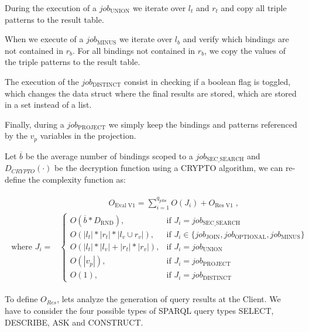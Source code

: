 During the execution of a $job_{\text{UNION}}$ we iterate over $l_t$ and $r_t$ and copy all triple patterns to the result table.

When we execute of a $job_{\text{MINUS}}$ we iterate over $l_b$ and verify which bindings are not contained in $r_b$. For all bindings not contained in $r_b$, we copy the values of the triple patterns to the result table.

The execution of the $job_{\text{DISTINCT}}$ consist in checking if a boolean flag is toggled, which changes the data struct where the final results are stored, which are stored in a set instead of a list.

Finally, during a $job_{\text{PROJECT}}$ we simply keep the bindings and patterns referenced by the $v_p$ variables in the projection.

Let $\overline{b}$ be the average number of bindings scoped to a $job_{\text{SEC\_SEARCH}}$ and $D_{CRYPTO}(\cdot)$ be the decryption function using a CRYPTO algorithm, we can re-define the complexity function as:

\begin{align}
    \label{equation:query-evaluation-v1-jobs}
    \begin{split}
        & \quad \quad \quad \quad \quad \quad O_{\text{Eval V1}} = \sum_{i=1}^{q_{\text{jobs}}} O\left(J_i\right) + O_{\text{Res V1}}\;,\\
        \text{where } J_i =&
                    \begin{cases}
                        O\left( \overline{b} * D_{\text{RND}} \right), & \text{if } J_i = job_{\text{SEC\_SEARCH}} \\
                        O\left(|l_t| * |r_t| * |l_v \cup r_v|\right), & \text{if } J_i \in \{job_{\text{JOIN}}, job_{\text{OPTIONAL}}, job_{\text{MINUS}}\} \\
                        O\left(|l_t| * |l_v| + |r_t| * |r_v|\right), & \text{if } J_i = job_{\text{UNION}} \\
                        O\left(|v_p|\right), & \text{if } J_i = job_{\text{PROJECT}} \\
                        O\left(1\right), & \text{if } J_i = job_{\text{DISTINCT}}
                    \end{cases}
    \end{split}
\end{align}

To define $O_{Res}$, lets analyze the generation of query results at the Client. We have to consider the four possible types of \gls{SPARQL} query types SELECT, DESCRIBE, ASK and CONSTRUCT. 

